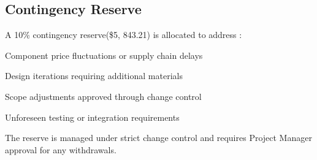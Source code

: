 \subsection{Contingency Reserve}

    A 10\%
    contingency reserve(\$5, 843.21) is allocated to address :

\begin {
  itemize
}
\item Component price fluctuations or supply chain delays
    \item Design iterations requiring additional materials
    \item Scope adjustments approved through change control
    \item Unforeseen testing or integration requirements
\end {
  itemize
}

\noindent The reserve is managed under strict change control and requires Project Manager approval for any withdrawals.
